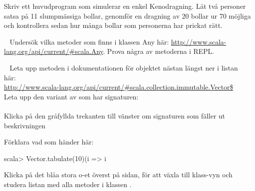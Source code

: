 {{\Subtask Skriv ett huvudprogram som simulerar en enkel Kenodragning. Låt två personer satsa på 11 slumpmässiga bollar, genomför en dragning av 20 bollar ur 70 möjliga och kontrollera sedan hur många bollar som personerna har prickat rätt.




\AdvancedTasks %

\SOLUTION


\QUESTEND







\QUESTBEGIN

\Task  \what~  Undersök vilka metoder som finns i klassen Any här: \href{http://www.scala-lang.org/api/current/\#scala.Any}{http://www.scala-lang.org/api/current/\#scala.Any}. Prova några av metoderna i REPL.

\SOLUTION


\QUESTEND







\QUESTBEGIN

\Task  \what~  Leta upp metoden  i dokumentationen för objektet  nästan längst ner i listan här: \\ \href{http://www.scala-lang.org/api/current/#scala.collection.immutable.Vector$}{http://www.scala-lang.org/api/current/\#scala.collection.immutable.Vector\$} \\Leta upp den variant av  som har signaturen:\\ \\ Klicka på den gråfyllda trekanten till vänster om signaturen som fäller ut beskrivningen

\Subtask Förklara vad som händer här:
\begin{REPLnonum}
scala> Vector.tabulate(10)(i => i %
\end{REPLnonum}

\Subtask Klicka på det blåa stora o-et överst på sidan, för att växla till klass-vyn och studera listan med alla metoder  i klassen .


\SOLUTION


\QUESTEND







}}
